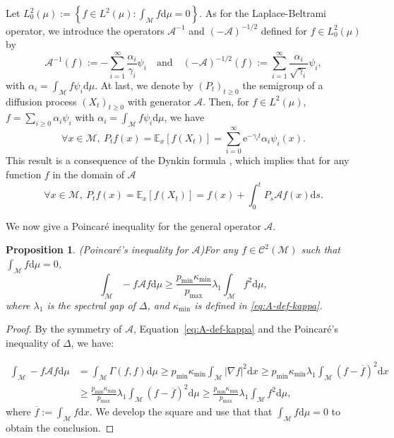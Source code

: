 \documentclass[10pt,a4paper]{article}
\newcommand{\E}{{\mathbb E}}
\newcommand\cA{\mathcal{A}}
\newcommand\cM{\mathcal{M}}
\newcommand\dd{\mathrm{d}}
\newcommand{\BRA}[1]{{{\left\{#1\right\}}}} %
\newcommand{\PAR}[1]{{{\left(#1\right)}}} %
\newcommand{\SBRA}[1]{{{\left[#1\right]}}} %
\newtheorem{proposition}[theorem]{Proposition}
\begin{document}
Let $L^2_0(\mu):=\BRA{f\in L^2(\mu): \int_\cM f\dd \mu=0}$. As for the Laplace-Beltrami operator, 
we introduce the operators  $\cA^{-1}$ and $\PAR{-\cA}^{-1/2}$ defined for $f\in L^2_0(\mu)$ by
 \begin{equation}\label{eq:A^1-A^-1/2}
 \cA^{-1}(f):=-\sum_{i=1}^\infty\frac{\alpha_i}{\gamma_i}\psi_i \quad \text{and}\quad 
 \PAR{-\cA}^{-1/2}(f):=\sum_{i=1}^\infty\frac{\alpha_i}{\sqrt{\gamma_i}}\psi_i,
 \end{equation}
  with 
 $\alpha_i=\int_\cM f\psi_i\dd \mu$.
At last, we denote by $(P_t)_{t\ge 0}$ the semigroup of a diffusion process $(X_t)_{t\ge 0}$ with generator $\cA$.  
  Then, for $f\in L^2(\mu)$, $f=\sum_{i\ge 0}\alpha_i\psi_i$ with $\alpha_i=\int_\cM f\psi_i\dd \mu$, we have
\[
\forall x \in \cM,\ P_tf(x)=\E_x\SBRA{f(X_t)}=\sum_{i=0}^\infty\mathrm{e}^{-\gamma_i t}\alpha_i\psi_i(x).
\]  
This result is a consequence of the
 Dynkin formula \cite{Kulik2018}, which implies that for any function $f$ in the domain of $\cA$ 
\[
\forall x \in \cM,\ P_tf(x)=\E_x[f(X_t)]=f(x)+\int_0^tP_s\cA f(x)\dd s.
\]



We now give a Poincaré inequality for the general operator $\cA$.
\begin{proposition}(Poincaré's inequality for $\cA$)\label{prop:poincare-A}
For any $f \in \mathcal{C}^2(\cM)$  such that $\int_\cM f\dd \mu=0$, 
$$   \int_\cM -f \mathcal{A}f \mathrm{d}\mu \ge \frac{p_{\min}\kappa_{\min}}{ p_{\max}}\lambda_1 \int_\cM f^2 \mathrm{d}\mu,$$
where $\lambda_1$ is the spectral gap of $\Delta$, and $\kappa_{\min}$ is defined in \eqref{eq:A-def-kappa}.
\end{proposition}
\begin{proof}
    By the symmetry of $\mathcal{A}$, Equation~\eqref{eq:A-def-kappa} and the Poincaré's inequality of $\Delta$, we have:

    \begin{align*}
    \int_\cM -f \mathcal{A}f \mathrm{d}\mu&= \int_\cM \Gamma(f,f) \mathrm{d} \mu \ge p_{\min}\kappa_{\min}\int_\cM |\nabla f|^2 \mathrm{d} x \ge p_{\min}\kappa_{\min}  \lambda_1 \int_\cM (f-\overline{f})^2 \mathrm{d} x
        \\
 &\ge  \frac{p_{\min}\kappa_{\min}}{p_{\max}}\lambda_1 \int_\cM (f-\overline{f})^2 \mathrm{d}\mu \ge \frac{p_{\min}\kappa_{\min}}{p_{\max}}\lambda_1 \int_\cM f^2 \mathrm{d}\mu, 
    \end{align*}
where $\overline{f}:= \int_\cM f \mathrm{d} x.$ We  develop the square and use that that $\int_\cM f\dd \mu=0$ to obtain the conclusion.
\end{proof}
\end{document}
